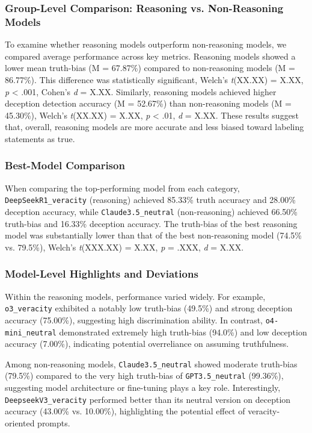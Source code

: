 \documentclass{article}
\begin{document}

\subsubsection*{Group-Level Comparison: Reasoning vs. Non-Reasoning Models}

To examine whether reasoning models outperform non-reasoning models, we compared average performance across key metrics. Reasoning models showed a lower mean truth-bias (M = 67.87\%) compared to non-reasoning models (M = 86.77\%). This difference was statistically significant, Welch's \textit{t}(XX.XX) = X.XX, \textit{p} < .001, Cohen's \textit{d} = X.XX. Similarly, reasoning models achieved higher deception detection accuracy (M = 52.67\%) than non-reasoning models (M = 45.30\%), Welch's \textit{t}(XX.XX) = X.XX, \textit{p} < .01, \textit{d} = X.XX. These results suggest that, overall, reasoning models are more accurate and less biased toward labeling statements as true.

\subsubsection*{Best-Model Comparison}

When comparing the top-performing model from each category, \texttt{DeepSeekR1\_veracity} (reasoning) achieved 85.33\% truth accuracy and 28.00\% deception accuracy, while \texttt{Claude3.5\_neutral} (non-reasoning) achieved 66.50\% truth-bias and 16.33\% deception accuracy. The truth-bias of the best reasoning model was substantially lower than that of the best non-reasoning model (74.5\% vs. 79.5\%), Welch's \textit{t}(XXX.XX) = X.XX, \textit{p} = .XXX, \textit{d} = X.XX.

\subsubsection*{Model-Level Highlights and Deviations}

Within the reasoning models, performance varied widely. For example, \texttt{o3\_veracity} exhibited a notably low truth-bias (49.5\%) and strong deception accuracy (75.00\%), suggesting high discrimination ability. In contrast, \texttt{o4-mini\_neutral} demonstrated extremely high truth-bias (94.0\%) and low deception accuracy (7.00\%), indicating potential overreliance on assuming truthfulness.

Among non-reasoning models, \texttt{Claude3.5\_neutral} showed moderate truth-bias (79.5\%) compared to the very high truth-bias of \texttt{GPT3.5\_neutral} (99.36\%), suggesting model architecture or fine-tuning plays a key role. Interestingly, \texttt{DeepseekV3\_veracity} performed better than its neutral version on deception accuracy (43.00\% vs. 10.00\%), highlighting the potential effect of veracity-oriented prompts.
\end{document}

